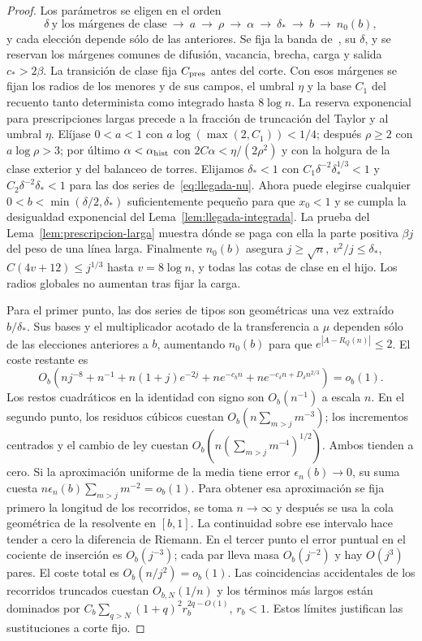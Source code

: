 \begin{proof}
Los parámetros se eligen en el orden
\[
 \delta\ \text{y los márgenes de clase}\ \longrightarrow\ a\ \longrightarrow\ \rho\ \longrightarrow\
 \alpha\ \longrightarrow\ \delta_*\ \longrightarrow\ b\ \longrightarrow\ n_0(b),
\]
y cada elección depende sólo de las anteriores.
Se fija la banda de~\cite[§5.4]{tc}, su \(\delta\), y se reservan los márgenes comunes
de difusión, vacancia, brecha, carga y salida \(c_*>2\beta\). La transición de clase
fija \(C_{\rm pres}\) antes del corte. Con esos márgenes se fijan los radios de los
menores y de sus campos, el umbral \(\eta\) y la base \(C_1\) del recuento tanto
determinista como integrado hasta \(8\log n\). La reserva exponencial para prescripciones
largas precede a la fracción de truncación del Taylor y al umbral \(\eta\).
Elíjase \(0<a<1\) con \(a\log(\max(2,C_1))<1/4\); después \(\rho\ge2\) con
\(a\log\rho>3\); por último \(\alpha<\alpha_{\rm hist}\) con \(2C\alpha<\eta/(2\rho^2)\)
y con la holgura de la clase exterior y del balanceo de torres.
Elijamos \(\delta_*<1\) con \(C_1\delta^{-2}\delta_*^{1/3}<1\) y
\(C_2\delta^{-2}\delta_*<1\) para las dos series de~\eqref{eq:llegada-nu}.
Ahora puede elegirse cualquier \(0<b<\min(\delta/2,\delta_*)\) suficientemente pequeño
para que \(x_0<1\) y se cumpla la desigualdad exponencial del
Lema~\ref{lem:llegada-integrada}. La prueba del Lema~\ref{lem:prescripcion-larga}
muestra dónde se paga con ella la parte positiva \(\beta j\) del peso de una línea larga.
Finalmente \(n_0(b)\) asegura \(j\ge\sqrt n,\ v^2/j\le\delta_*\),
\(C(4v+12)\le j^{1/3}\) hasta \(v=8\log n\), y todas las cotas de clase en el hijo.
Los radios globales no aumentan tras fijar la carga.

Para el primer punto, las dos series de tipos son geométricas una vez extraído
\(b/\delta_*\). Sus bases y el multiplicador acotado de la transferencia a \(\mu\)
dependen sólo de las elecciones anteriores a \(b\), aumentando \(n_0(b)\) para que
\(e^{|A-R_Q(n)|}\le2\). El coste restante es
\[
 O_b\!\left(nj^{-8}+n^{-1}+n(1+j)e^{-2j}+ne^{-c_b n}
           +n e^{-c_\delta n+D_\delta n^{2/3}}\right)=o_b(1).
\]
Los restos cuadráticos en la identidad con signo son \(O_b(n^{-1})\) a escala \(n\).
En el segundo punto, los residuos cúbicos cuestan \(O_b(n\sum_{m>j}m^{-3})\);
los incrementos centrados y el cambio de ley cuestan
\(O_b(n(\sum_{m>j}m^{-4})^{1/2})\). Ambos tienden a cero. Si la aproximación
uniforme de la media tiene error \(\epsilon_n(b)\to0\), su suma cuesta
\(n\epsilon_n(b)\sum_{m>j}m^{-2}=o_b(1)\). Para obtener esa aproximación se fija
primero la longitud de los recorridos, se toma \(n\to\infty\) y después se usa la
cola geométrica de la resolvente en \([b,1]\). La continuidad sobre ese intervalo
hace tender a cero la diferencia de Riemann. En el tercer punto el error puntual en
el cociente de inserción es \(O_b(j^{-3})\); cada par lleva masa \(O_b(j^{-2})\)
y hay \(O(j^3)\) pares. El coste total es \(O_b(n/j^2)=o_b(1)\).
Las coincidencias accidentales de los recorridos truncados cuestan \(O_{b,N}(1/n)\)
y los términos más largos están dominados por \(C_b\sum_{q>N}(1+q)^2r_b^{2q-O(1)}\),
\(r_b<1\). Estos límites justifican las sustituciones a corte fijo.
\end{proof}
